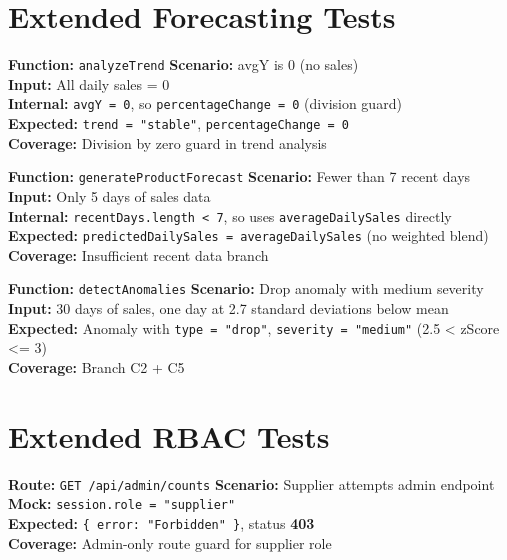 ﻿\documentclass[12pt,a4paper]{report}
\newcommand{\pone}{\textbf{\color{p1red}P1}}
\newcommand{\ptwo}{\textbf{\color{p2orange}P2}}
\newcommand{\pthree}{\textbf{\color{p3blue}P3}}
\begin{document}
\section{Extended Forecasting Tests}

\begin{tcolorbox}[testbox,title={FORE-016 \hfill \ptwo}]
\textbf{Function:} \texttt{analyzeTrend} \quad \textbf{Scenario:} avgY is 0 (no sales) \\
\textbf{Input:} All daily sales = 0 \\
\textbf{Internal:} \texttt{avgY = 0}, so \texttt{percentageChange = 0} (division guard) \\
\textbf{Expected:} \texttt{trend = "stable"}, \texttt{percentageChange = 0} \\
\textbf{Coverage:} Division by zero guard in trend analysis
\end{tcolorbox}

\begin{tcolorbox}[testbox,title={FORE-017 \hfill \ptwo}]
\textbf{Function:} \texttt{generateProductForecast} \quad \textbf{Scenario:} Fewer than 7 recent days \\
\textbf{Input:} Only 5 days of sales data \\
\textbf{Internal:} \texttt{recentDays.length < 7}, so uses \texttt{averageDailySales} directly \\
\textbf{Expected:} \texttt{predictedDailySales = averageDailySales} (no weighted blend) \\
\textbf{Coverage:} Insufficient recent data branch
\end{tcolorbox}

\begin{tcolorbox}[testbox,title={FORE-018 \hfill \pthree}]
\textbf{Function:} \texttt{detectAnomalies} \quad \textbf{Scenario:} Drop anomaly with medium severity \\
\textbf{Input:} 30 days of sales, one day at 2.7 standard deviations below mean \\
\textbf{Expected:} Anomaly with \texttt{type = "drop"}, \texttt{severity = "medium"} (2.5 < zScore <= 3) \\
\textbf{Coverage:} Branch C2 + C5
\end{tcolorbox}

\section{Extended RBAC Tests}

\begin{tcolorbox}[criticalbox,title={RBAC-006 \hfill \pone\ --- Supplier Cannot Access Admin Routes}]
\textbf{Route:} \texttt{GET /api/admin/counts} \quad \textbf{Scenario:} Supplier attempts admin endpoint \\
\textbf{Mock:} \texttt{session.role = "supplier"} \\
\textbf{Expected:} \texttt{\{ error: "Forbidden" \}}, status \textbf{403} \\
\textbf{Coverage:} Admin-only route guard for supplier role
\end{tcolorbox}
\end{document}
